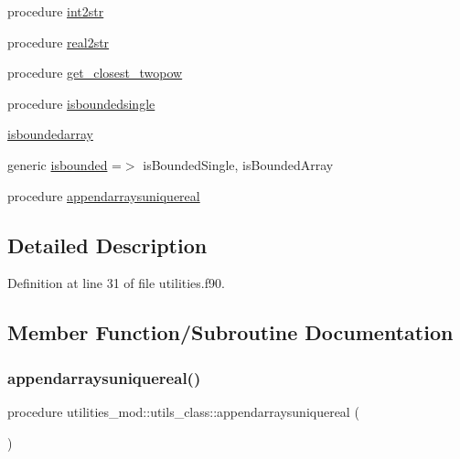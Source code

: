 \begin{DoxyCompactItemize}
\item 
procedure \mbox{\hyperlink{structutilities__mod_1_1utils__class_ae3a7fea394d64f5f4592504841b07777}{int2str}}
\item 
procedure \mbox{\hyperlink{structutilities__mod_1_1utils__class_a150e3763affd525139f135d6cbbca026}{real2str}}
\item 
procedure \mbox{\hyperlink{structutilities__mod_1_1utils__class_a2fa5e32b744821f0c74e30aeb99e1e2b}{get\+\_\+closest\+\_\+twopow}}
\item 
procedure \mbox{\hyperlink{structutilities__mod_1_1utils__class_aac36fc53d19b8bd8c37a2dfcf74f1fcc}{isboundedsingle}}
\item 
\mbox{\hyperlink{structutilities__mod_1_1utils__class_ae513529301733a624bcb1e984131edcd}{isboundedarray}}
\item 
generic \mbox{\hyperlink{structutilities__mod_1_1utils__class_acd0be828aa3a873c635cb9742ef06b13}{isbounded}} =$>$ is\+Bounded\+Single, is\+Bounded\+Array
\item 
procedure \mbox{\hyperlink{structutilities__mod_1_1utils__class_aeb0f0bfbea1b5a1d1dc5ed88abd272fb}{appendarraysuniquereal}}
\end{DoxyCompactItemize}


\subsection{Detailed Description}


Definition at line 31 of file utilities.\+f90.



\subsection{Member Function/\+Subroutine Documentation}
\mbox{\label{structutilities__mod_1_1utils__class_aeb0f0bfbea1b5a1d1dc5ed88abd272fb}} 
\subsubsection{\texorpdfstring{appendarraysuniquereal()}{appendarraysuniquereal()}}
{\footnotesize\ttfamily procedure utilities\+\_\+mod\+::utils\+\_\+class\+::appendarraysuniquereal (\begin{DoxyParamCaption}{ }\end{DoxyParamCaption})\hspace{0.3cm}{\ttfamily [private]}}



